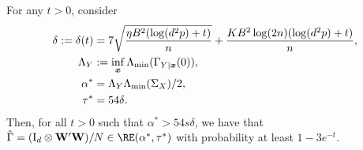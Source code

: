 \begin{prop}\label{prop:RE_ours}
    For any $t > 0$, consider 
    \begin{align*}
        \delta := \delta(t) &= 7\sqrt{\frac{\eta B^2 (\log(d^2p) + t)}{ n} } + \frac{ K B^2\log(2n)(\log(d^2p) + t) }{n},\\
        \Lambda_{Y} &:= \inf_{\bm{x}} \Lambda_{\min} (\Gamma_{Y|\bm{x}}(0)),\\
        \alpha^* &= \Lambda_{Y}\Lambda_{\min}(\Sigma_X) /2,\\
        \tau^* &= {54\delta}.
    \end{align*}
    Then, for all $t > 0$ such that $\alpha^* > 54s\delta$, we have that $\hat\Gamma = (\Ir_d \otimes \Wb'\Wb)/N \in\RE(\alpha^*,\tau^*)$ with probability at least $1- 3e^{-t}$.
\end{prop}
